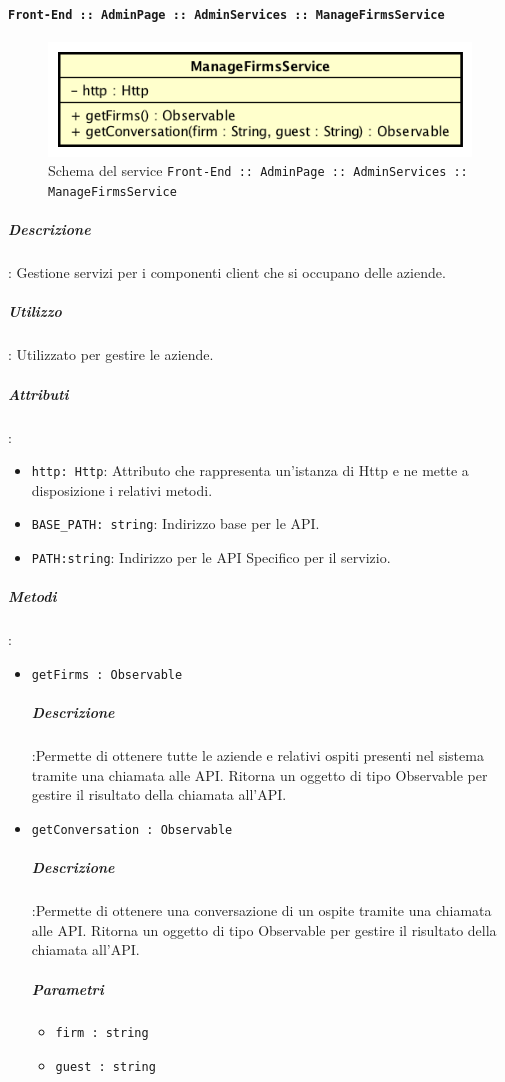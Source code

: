 \documentclass[../DefinizioneDiProdotto_v3.0.0.tex]{subfiles}
\begin{document}
\newpage
		      	\paragraph{\texttt{Front-End :: AdminPage :: AdminServices :: ManageFirmsService}}
		      	\acapo
				\begin{figure}[!h]
					\centering
					\includegraphics[scale=0.7]{Architettura/Front-End/AdminPage/AdminServices/ManageFirmsService.png}
					\caption{Schema del service \texttt{Front-End :: AdminPage :: AdminServices :: ManageFirmsService}}
				\end{figure}
			      	\subparagraph{Descrizione}: Gestione servizi per i componenti client che si occupano delle aziende.
			      	\subparagraph{Utilizzo}: Utilizzato per gestire le aziende.
			      	\subparagraph{Attributi}:
      	      		\begin{itemize}
						\item \texttt{http: Http}: Attributo che rappresenta un'istanza di Http e ne mette a disposizione i relativi metodi.
						\item \texttt{BASE\_PATH: string}: Indirizzo base per le API.
						\item \texttt{PATH:string}: Indirizzo per le API Specifico per il servizio.
	      	      	\end{itemize}
			      	\subparagraph{Metodi}:
	      	      	\begin{itemize}
						\item \texttt{getFirms : Observable}
						\subparagraph{Descrizione}:Permette di ottenere tutte le aziende e relativi ospiti presenti nel sistema tramite una chiamata alle API. Ritorna un oggetto di tipo Observable per gestire il risultato della chiamata all'API.
						\item \texttt{getConversation : Observable}
						\subparagraph{Descrizione}:Permette di ottenere una conversazione di un ospite tramite una chiamata alle API. Ritorna un oggetto di tipo Observable per gestire il risultato della chiamata all'API.
						\subparagraph{Parametri}\begin{itemize}
							\item \texttt{firm : string}
							\item \texttt{guest : string}
						\end{itemize}
	      	      	\end{itemize}
\end{document}
